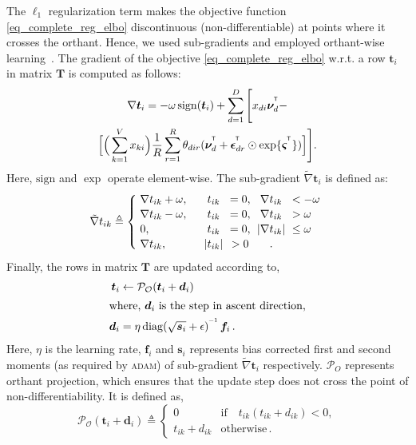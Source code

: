 \documentclass[journal]{IEEEtran}
\newcommand*{\T}{^{\mkern-1.2mu\mathsf{T}}}     \newcommand*{\I}{^{\mkern-1.2mu\mathsf{-1}}}    \newcommand*{\IT}{^{\mkern-1.2mu\mathsf{-T}}}   \newcommand*{\ts}{_{\mkern-1.2mu\mathsf{t}}}    \newcommand{\nr}[1]{_{\mkern+2.0mu\mathsf{#1}}}
\newcommand{\mb}[1]{\bm{#1}}
\newcommand{\bs}[1]{\bm{#1}}
\begin{document}
The \(\ell_1\) regularization term makes the objective function 
\eqref{eq_complete_reg_elbo} discontinuous (non-differentiable) at points 
where it crosses the orthant. Hence, we used sub-gradients and employed 
orthant-wise learning~\cite{Andrew:2007:L1}. The gradient of the objective 
\eqref{eq_complete_reg_elbo} w.r.t. a row \(\mb{t}_i\) in matrix \(\mb{T}\) is 
computed as follows:
\begin{multline}
\label{eq_grad_t}
\nabla \mb{t}_i = -\omega \, \mathrm{sign}(\mb{t}_i) + \sum_{d=1}^{D} \Bigg[x_{di} \bs{\nu}_d^{\T} - \\
\Big[\Big(\sum_{k=1}^{V} x_{ki} \Big) \frac{1}{R}\sum_{r=1}^{R}\theta_{dir} (\bs{\nu}_d^{\T} + \bs{\epsilon}_{dr}^{\T} \odot \exp\{\bs{\varsigma}^{\T}\}) \Big]  \Bigg].
\end{multline}
Here, \(\mathrm{sign}\) and \(\exp\) operate element-wise. The sub-gradient \(\tilde{\nabla} \mb{t}_i\) is defined as:
\begin{equation}
\label{eq_subg}
\tilde{\nabla} {t}_{ik} \triangleq \left\{
\arraycolsep=3pt\def\arraystretch{1.1}
\begin{array}{lcccl}
\nabla {t}_{ik} + \omega, & \quad t_{ik}   & = 0, & \nabla {t}_{ik} & < -\omega \\
\nabla {t}_{ik} - \omega, & \quad t_{ik}   & = 0, & \nabla {t}_{ik} & > \omega \\
0,                        & \quad t_{ik}   & = 0, & |\nabla {t}_{ik}| & \leq \omega \\
\nabla {t}_{ik},          & \quad |t_{ik}| & > 0  & .
\end{array} \right.
\end{equation}
Finally, the rows in matrix \(\mb{T}\) are updated according to,
\begin{align}
\label{eq_t_update}
\mb{t}_i &\leftarrow \mathcal{P_O}(\mb{t}_i + \mb{d}_i)\, \\
\intertext{where, \(\mb{d}_i\) is the step in ascent direction,}
\mb{d}_i &= \eta \, \mathrm{diag}(\sqrt{\mb{s}_i} + \epsilon)^{\I} \, 
\mb{f}_{i} \label{eq_t_step}\,. 
\end{align}
Here, \(\eta\) is the learning rate, \(\mb{f}_i\) and \(\mb{s}_i\) represents 
bias corrected first and second moments (as required by \textsc{adam}) of 
sub-gradient \(\tilde{\nabla}\mb{t}_{i}\) respectively.
\(\mathcal{P}_{O}\) represents orthant projection, which ensures that the 
update step does not cross the point of non-differentiability. It is defined as,
\begin{equation}
\mathcal{P_O}(\mb{t}_i + \mb{d}_i) \triangleq \left\{
\begin{array}{ll} 0  & \textrm{if} \quad t_{ik}(t_{ik} + d_{ik}) < 0, \\
t_{ik} + d_{ik} & \textrm{otherwise} \,.
\end{array} \right. \label{eq_orth}
\end{equation}
\end{document}
